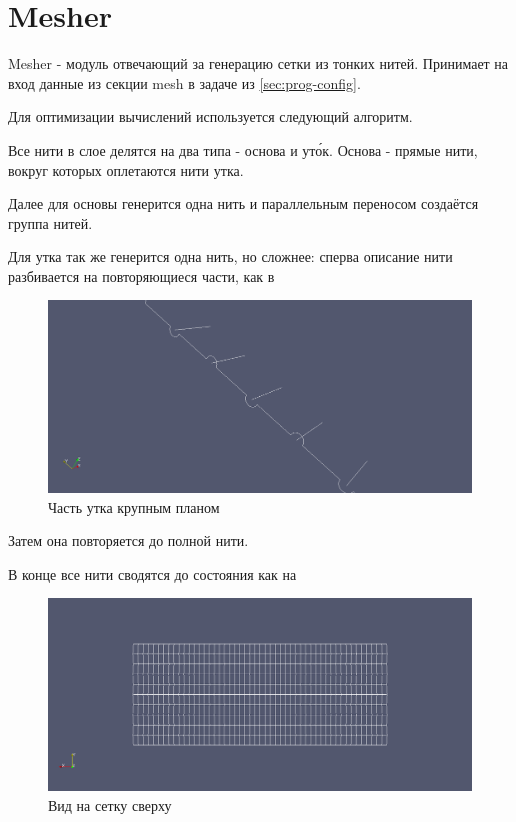 \section{Mesher}\label{sec:prog-mesher}
Mesher - модуль отвечающий за генерацию сетки из тонких нитей.
Принимает на вход данные из секции mesh в задаче из \ref{sec:prog-config}.

Для оптимизации вычислений используется следующий алгоритм.

Все нити в слое делятся на два типа - основа и ут\'{о}к. Основа - прямые нити, вокруг которых оплетаются нити утка.

Далее для основы генерится одна нить и параллельным переносом создаётся группа нитей.

Для утка так же генерится одна нить, но сложнее: сперва описание нити разбивается на повторяющиеся части, как в

\begin{figure}[H]
    \centering
    \caption{Часть утка крупным планом}
    \label{fig:weft-fiber}
    \includegraphics[width=1.0\textwidth]{img/weft_fiber.png}
\end{figure}

Затем она повторяется до полной нити.

В конце все нити сводятся до состояния как на 
\begin{figure}[H]
    \centering
    \caption{Вид на сетку сверху}
    \label{fig:scheme}
    \includegraphics[width=1.0\textwidth]{img/scheme.png}
\end{figure}

